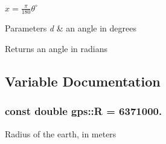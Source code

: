 $ x = \frac{\pi}{180} \theta^\circ $


\begin{DoxyParams}{Parameters}
{\em d} & an angle in degrees \\
\hline
\end{DoxyParams}
\begin{DoxyReturn}{Returns}
an angle in radians 
\end{DoxyReturn}


\subsection{Variable Documentation}
\subsubsection[{\texorpdfstring{R}{R}}]{\setlength{\rightskip}{0pt plus 5cm}const double gps\+::R = 6371000.}\hypertarget{namespacegps_a336bcadf804afba736e0cf773b5a36e8}{}\label{namespacegps_a336bcadf804afba736e0cf773b5a36e8}
Radius of the earth, in meters 